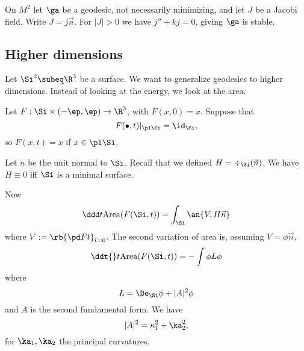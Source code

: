 On $M^2$ let $\ga$ be a geodesic, not necessarily minimizing, and let $J$ be a Jacobi field. Write $J=j\vec n$. For $|J|>0$ we have $j''+kj=0$, giving $\ga$ is stable.


\subsection{Higher dimensions}
Let $\Si^2\subeq \R^3$ be a surface. We want to generalize geodesics to higher dimensions. Instead of looking at the energy, we look at the area.

Let $F:\Si\times (-\ep,\ep)\to \R^3$, with $F(x,0)=x$. Suppose that %
\[
F(\bullet, t)|_{\pl \Si} =\id_{\Si},
\]
so $F(x,t)=x$ if $x\in \pl \Si$.

Let $n$ be the unit normal to $\Si$. Recall that we defined $H=\div_{\Si}(\vec n)$. We have $H\equiv 0$ iff $\Si$ is a minimal surface.

Now 
\[
\ddd t\text{Area}(F(\Si,t))=\int_{\Si} \an{V,H\vec n}
\]
where $V:=\rb{\pd Ft}_{t=0}$. 
The second variation of area is, assuming $V=\phi \vec n$,
\[
\ddt{}t\text{Area}(F(\Si,t))=-\int \phi L\phi
\]
where 
\[L=\De_{\Si}\phi+|A|^2\phi
\]
and $A$ is the second fundamental form. We have
\[
|A|^2=\kappa_1^2+\ka_2^2,
\]
for $\ka_1,\ka_2$ the principal curvatures.

